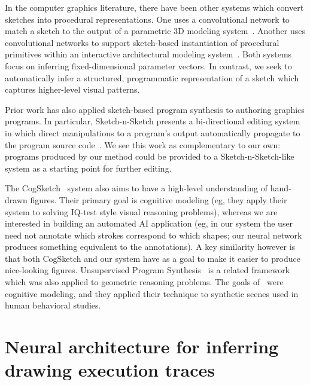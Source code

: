 \documentclass{article}
\begin{document}
In the computer graphics literature, there have been other systems which convert sketches into procedural representations. One uses a convolutional network to match a sketch to the output of a parametric 3D modeling system~\cite{huang2017shape}. Another uses convolutional networks to support sketch-based instantiation of procedural primitives within an interactive architectural modeling system~\cite{Nishida:2016:ISU:2897824.2925951}. Both systems focus on inferring fixed-dimensional parameter vectors. In contrast, we seek to automatically infer a structured, programmatic representation of a sketch which captures higher-level visual patterns.

Prior work has also applied sketch-based program synthesis to authoring graphics programs. In particular, Sketch-n-Sketch presents a bi-directional editing system in which direct manipulations to a program's output automatically propagate to the program source code~\cite{Hempel:2016:SSP:2984511.2984575}. We see this work as complementary to our own: programs produced by our method could be provided to a Sketch-n-Sketch-like system as a starting point for further editing.

The CogSketch~\cite{forbus2011cogsketch} system also aims to have a
high-level understanding of hand-drawn figures. Their primary goal is
cognitive modeling (eg, they apply their system to solving IQ-test
style visual reasoning problems), whereas we are interested in
building an automated AI application (eg, in our system the user need
not annotate which strokes correspond to which shapes; our neural
network produces something equivalent to the annotations).  A key
similarity however is that both CogSketch and our system have as a
goal to make it easier to produce nice-looking figures.
Unsupervised Program Synthesis~\cite{ellis2015unsupervised} is a related framework which was also applied to geometric reasoning problems. The goals of~\cite{ellis2015unsupervised} were cognitive modeling,
and they applied their technique to synthetic scenes used in human behavioral studies.





\section{Neural architecture for inferring drawing execution traces}\label{neuralNetworkSection}
\end{document}

